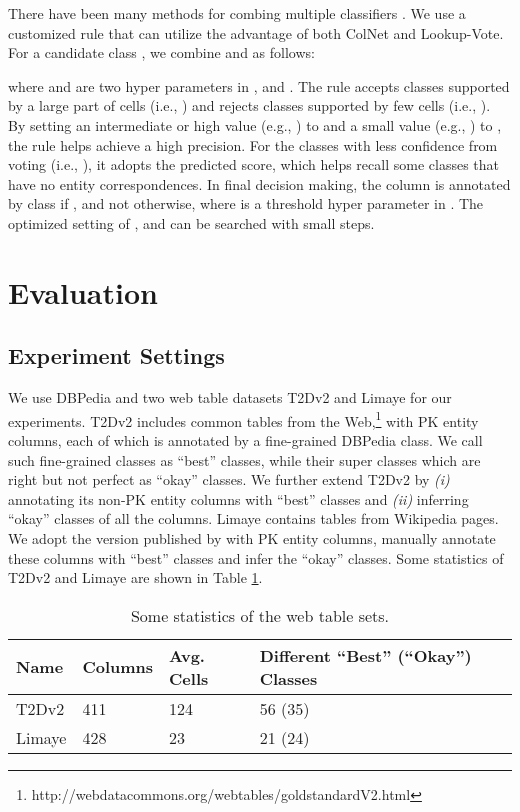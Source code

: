 \documentclass[letterpaper]{article}
\newcommand{\rv}[1]{{\color{black}#1}}
\newcommand{\camera}[1]{{\color{black}#1}}
\newcommand{\ColNet}{\textsf{ColNet}\xspace}
\begin{document}
\rv{There have been many methods for combing multiple classifiers \cite{ponti2011combining}.
We use a customized rule that can utilize the advantage of both \ColNet and Lookup-Vote.}
For a candidate class , we combine  and  as follows: 

where  and  are two hyper parameters in ,
\rv{and .
The rule accepts classes supported by a large part of cells (i.e., ) 
and rejects classes supported by few cells (i.e., ).
By setting an intermediate or high value (e.g., ) to  and a small value (e.g., ) to , the rule helps achieve a high precision.
For the classes with less confidence from voting (i.e., ), 
it adopts the predicted score,
which helps recall some classes that have no entity correspondences.
}
In final decision making,
the column is annotated by class  if ,
and not otherwise, 
where  is a threshold hyper parameter in .
\rv{The optimized setting of ,  and  can be searched with small steps.}






\section{Evaluation}

\subsection{Experiment Settings}

We use DBPedia \cite{auer2007dbpedia} and two web table \camera{datasets} T2Dv2 and Limaye for our experiments.
T2Dv2
includes common tables from the Web,\footnote{http://webdatacommons.org/webtables/goldstandardV2.html} 
with  \rv{PK} entity columns,
each of which is annotated by a fine-grained DBPedia class. 
We call such fine-grained classes as ``best'' classes,  
while their super classes which are right but not perfect as ``okay'' classes.
We further extend T2Dv2 by \textit{(i)} annotating its  non-PK entity columns with ``best'' classes
and \textit{(ii)} inferring ``okay'' classes of all the columns. 
Limaye 
contains tables from Wikipedia pages.
We adopt the version published by \cite{efthymiou2017matching} with  PK entity columns, 
manually annotate these columns with ``best'' classes
and infer the ``okay'' classes.
Some statistics of T2Dv2 and Limaye are shown in Table \ref{res:datasets}.

\begin{table}[h!]
\scriptsize{
\centering
\begin{tabular}[t]{p{1cm}<{\centering}|p{0.9cm}<{\centering}|p{1.1cm}<{\centering}|p{3.5cm}<{\centering}
}
\hline
Name & Columns & Avg. Cells & Different ``Best'' (``Okay'') Classes \\\hline 
T2Dv2 &411&124&56 (35) \\\hline
Limaye &428 &23 &21 (24) \\\hline
\end{tabular}
\caption{
\label{res:datasets}
Some statistics of the web table sets.
}
}
\end{table}
\end{document}
